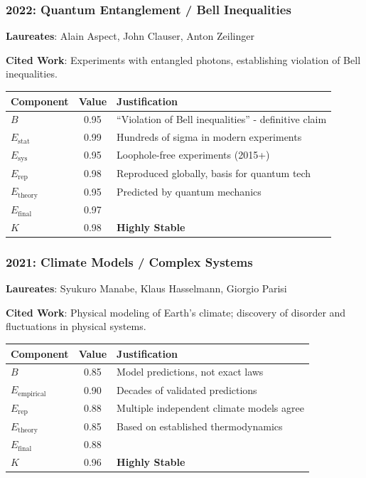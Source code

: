 \documentclass[11pt,a4paper]{article}
\begin{document}
\subsubsection{2022: Quantum Entanglement / Bell Inequalities}
\textbf{Laureates}: Alain Aspect, John Clauser, Anton Zeilinger

\textbf{Cited Work}: Experiments with entangled photons, establishing violation of Bell inequalities.

\begin{center}
\begin{tabular}{lcl}
\toprule
\textbf{Component} & \textbf{Value} & \textbf{Justification} \\
\midrule
$B$ & 0.95 & ``Violation of Bell inequalities'' - definitive claim \\
$E_{\text{stat}}$ & 0.99 & Hundreds of sigma in modern experiments \\
$E_{\text{sys}}$ & 0.95 & Loophole-free experiments (2015+) \\
$E_{\text{rep}}$ & 0.98 & Reproduced globally, basis for quantum tech \\
$E_{\text{theory}}$ & 0.95 & Predicted by quantum mechanics \\
\midrule
$E_{\text{final}}$ & 0.97 & \\
$K$ & 0.98 & \textbf{Highly Stable} \\
\bottomrule
\end{tabular}
\end{center}

\subsubsection{2021: Climate Models / Complex Systems}
\textbf{Laureates}: Syukuro Manabe, Klaus Hasselmann, Giorgio Parisi

\textbf{Cited Work}: Physical modeling of Earth's climate; discovery of disorder and fluctuations in physical systems.

\begin{center}
\begin{tabular}{lcl}
\toprule
\textbf{Component} & \textbf{Value} & \textbf{Justification} \\
\midrule
$B$ & 0.85 & Model predictions, not exact laws \\
$E_{\text{empirical}}$ & 0.90 & Decades of validated predictions \\
$E_{\text{rep}}$ & 0.88 & Multiple independent climate models agree \\
$E_{\text{theory}}$ & 0.85 & Based on established thermodynamics \\
\midrule
$E_{\text{final}}$ & 0.88 & \\
$K$ & 0.96 & \textbf{Highly Stable} \\
\bottomrule
\end{tabular}
\end{center}
\end{document}
